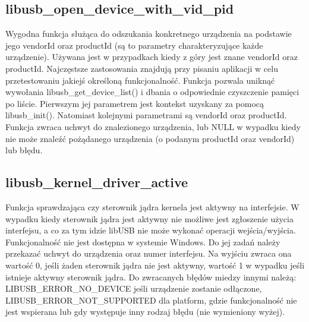 \documentclass{BscUS}
\begin{document}
\subsection{libusb\_open\_device\_with\_vid\_pid}
\noindent Wygodna funkcja służąca do odszukania konkretnego urządzenia na podstawie jego vendorId oraz productId (są to parametry charakteryzujące każde urządzenie).
Używana jest w przypadkach kiedy z góry jest znane vendorId oraz productId. Najczęstsze zastosowania znajdują przy pisaniu aplikacji w celu przetestowaniu jakiejś określoną funkcjonalność. Funkcja pozwala uniknąć wywołania libusb\_get\_device\_list() i dbania o odpowiednie czyszczenie pamięci po liście.
Pierwszym jej parametrem jest kontekst uzyskany za pomocą libusb\_init().
Natomiast kolejnymi parametrami są vendorId oraz productId.
Funkcja zwraca uchwyt do znalezionego urządzenia, lub NULL w wypadku kiedy nie może znaleźć pożądanego urządzenia (o podanym productId oraz vendorId) lub błędu.
\subsection{libusb\_kernel\_driver\_active}
\noindent Funkcja sprawdzająca czy sterownik jądra kernela jest aktywny na interfejsie.
W wypadku kiedy sterownik jądra jest aktywny nie możliwe jest zgłoszenie użycia interfejsu, a co za tym idzie libUSB nie może wykonać operacji wejścia/wyjścia.
Funkcjonalność nie jest dostępna w systemie Windows.
Do jej zadań należy przekazać uchwyt do urządzenia oraz numer interfejsu.
Na wyjściu zwraca ona wartość 0, jeśli żaden sterownik jądra nie jest aktywny, wartość 1 w wypadku jeśli istnieje aktywny sterownik jądra.
\newline
Do zwracanych błędów miedzy innymi należą: LIBUSB\_ERROR\_NO\_DEVICE jeśli urządzenie zostanie odłączone, LIBUSB\_ERROR\_NOT\_SUPPORTED dla platform, gdzie funkcjonalność nie jest wspierana lub gdy występuje inny rodzaj błędu (nie wymieniony wyżej).
\end{document}
